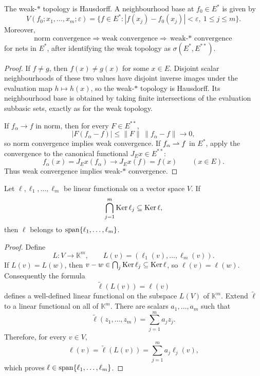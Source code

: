 \begin{noteproposition}
The weak-$*$ topology is Hausdorff.  A neighbourhood base at $f_0\in E^*$ is
given by
\[
  V(f_0;x_1,\ldots,x_m;\varepsilon)
  =\{f\in E^*:|f(x_j)-f_0(x_j)|<\varepsilon,
                    \ 1\le j\le m\}.
\]
Moreover,
\[
  \text{norm convergence}\Longrightarrow
  \text{weak convergence}\Longrightarrow
  \text{weak-$*$ convergence}
\]
for nets in $E^*$, after identifying the weak topology as
$\sigma(E^*,E^{**})$.
\end{noteproposition}

\begin{proof}
If $f\ne g$, then $f(x)\ne g(x)$ for some $x\in E$.  Disjoint scalar
neighbourhoods of these two values have disjoint inverse images under the
evaluation map $h\mapsto h(x)$, so the weak-$*$ topology is Hausdorff.  Its
neighbourhood base is obtained by taking finite intersections of the
evaluation subbasic sets, exactly as for the weak topology.

If $f_\alpha\to f$ in norm, then for every $F\in E^{**}$,
\[
  |F(f_\alpha-f)|\le\|F\|\,\|f_\alpha-f\|\longrightarrow0,
\]
so norm convergence implies weak convergence.  If $f_\alpha\rightharpoonup f$ in
$E^*$, apply the convergence to the canonical functional $J_Ex\in E^{**}$:
\[
  f_\alpha(x)=J_Ex(f_\alpha)
  \longrightarrow J_Ex(f)=f(x)
  \qquad(x\in E).
\]
Thus weak convergence implies weak-$*$ convergence.
\end{proof}

\begin{notelemma}
Let $\ell,\ell_1,\ldots,\ell_m$ be linear functionals on a vector space $V$.
If
\[
  \bigcap_{j=1}^m\operatorname{Ker}\ell_j\subseteq\operatorname{Ker}\ell,
\]
then $\ell$ belongs to $\operatorname{span}\{\ell_1,\ldots,\ell_m\}$.
\end{notelemma}

\begin{proof}
Define
\[
  L\colon V\to\mathbb K^m,
  \qquad
  L(v)=(\ell_1(v),\ldots,\ell_m(v)).
\]
If $L(v)=L(w)$, then $v-w\in\bigcap_j\operatorname{Ker}\ell_j\subseteq\operatorname{Ker}\ell$, so
$\ell(v)=\ell(w)$.  Consequently the formula
\[
  \widetilde\ell(L(v))=\ell(v)
\]
defines a well-defined linear functional on the subspace $L(V)$ of
$\mathbb K^m$.  Extend $\widetilde\ell$ to a linear functional on all of
$\mathbb K^m$.  There are scalars $a_1,\ldots,a_m$ such that
\[
  \widetilde\ell(z_1,\ldots,z_m)=\sum_{j=1}^m a_jz_j.
\]
Therefore, for every $v\in V$,
\[
  \ell(v)=\widetilde\ell(L(v))
         =\sum_{j=1}^m a_j\ell_j(v),
\]
which proves $\ell\in\operatorname{span}\{\ell_1,\ldots,\ell_m\}$.
\end{proof}

